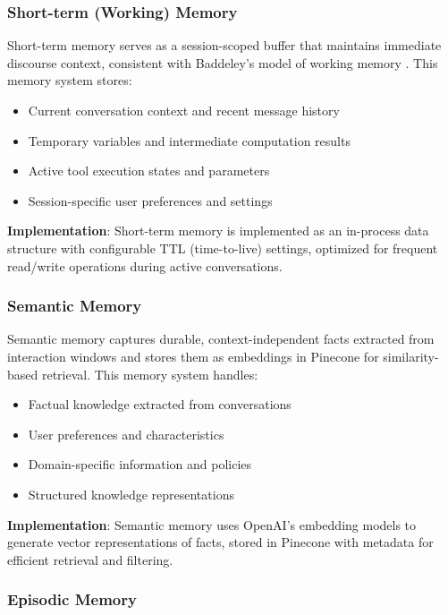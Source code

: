 \documentclass[11pt]{article}
\begin{document}
\subsubsection{Short-term (Working) Memory}

Short-term memory serves as a session-scoped buffer that maintains immediate discourse context, consistent with Baddeley's model of working memory \cite{baddeley1992working}. This memory system stores:

\begin{itemize}
\item Current conversation context and recent message history
\item Temporary variables and intermediate computation results
\item Active tool execution states and parameters
\item Session-specific user preferences and settings
\end{itemize}

\textbf{Implementation}: Short-term memory is implemented as an in-process data structure with configurable TTL (time-to-live) settings, optimized for frequent read/write operations during active conversations.

\subsubsection{Semantic Memory}

Semantic memory captures durable, context-independent facts extracted from interaction windows and stores them as embeddings in Pinecone for similarity-based retrieval. This memory system handles:

\begin{itemize}
\item Factual knowledge extracted from conversations
\item User preferences and characteristics
\item Domain-specific information and policies
\item Structured knowledge representations
\end{itemize}

\textbf{Implementation}: Semantic memory uses OpenAI's embedding models to generate vector representations of facts, stored in Pinecone with metadata for efficient retrieval and filtering.

\subsubsection{Episodic Memory}
\end{document}
